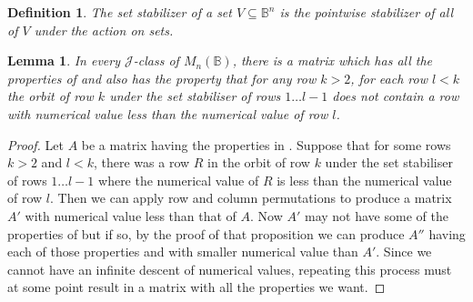 \documentclass[11pt]{article}
\newtheorem{lemma}[thm]{Lemma}
\newtheorem{defi}[thm]{Definition}
\numberwithin{equation}{section}
\newcommand{\B}{\mathbb{B}}
\newcommand{\Bn}{M_n(\B)}
\newcommand{\J}{\mathscr{J}}
\begin{document}
\begin{defi}
  The \emph{set stabilizer} of a set $V \subseteq \B^n$ is the pointwise
  stabilizer of all of $V$ under the action on sets. 
\end{defi}

\begin{lemma}
  In every $\J$-class of $\Bn$, there is a matrix which has all the properties of  and also has the property that for any row $k > 2$, for each row $l < k$ the orbit of row $k$ under the set stabiliser of rows $1 \dots l - 1$ does not contain a row with numerical value less than the numerical value of row $l$.
\end{lemma}

\begin{proof}
  Let $A$ be a matrix having the properties in . Suppose that for some rows $k > 2$ and $l < k$, there was a row $R$ in the orbit of row $k$ under the set stabiliser of rows $1 \dots l - 1$ where the numerical value of $R$ is less than the numerical value of row $l$. Then we can apply row and column permutations to produce a matrix $A'$ with numerical value less than that of $A$. Now $A'$ may not have some of the properties of
   but if so, by the proof of that proposition we can produce $A''$ having each of those properties and with smaller numerical value than $A'$. Since we cannot have an infinite descent of numerical values, repeating this process must at some point result in a matrix with all the properties we want.
\end{proof}
\end{document}
